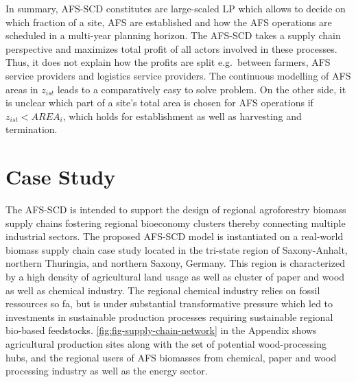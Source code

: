 \documentclass[APA,TimesLARGE]{WileyNJDv5} %
\newcommand{\problemm}{AFS-SCD }
\begin{document}
In summary, \problemm constitutes are large-scaled LP which allows to decide on which fraction of a site, AFS are established and how the AFS operations are scheduled in a multi-year planning horizon. The \problemm takes a supply chain perspective and maximizes total profit of all actors involved in these processes. Thus, it does not explain how the profits are split e.g.~between farmers, AFS service providers and logistics service providers. The continuous modelling of AFS areas in \(z_{ist}\) leads to a comparatively easy to solve problem. On the other side, it is unclear which part of a site's total area is chosen for AFS operations if \(z_{ist} < AREA_i\), which holds for establishment as well as harvesting and termination.

\section{Case Study}\label{sec-casestudy}

The \problemm is intended to support the design of regional agroforestry biomass supply chains fostering regional bioeconomy clusters thereby connecting multiple industrial sectors. The proposed \problemm model is instantiated on a real-world biomass supply chain case study located in the tri-state region of Saxony-Anhalt, northern Thuringia, and northern Saxony, Germany. This region is characterized by a high density of agricultural land usage as well as cluster of paper and wood as well as chemical industry. The regional chemical industry relies on fossil ressources so fa, but is under substantial transformative pressure which led to investments in sustainable production processes requiring sustainable regional bio-based feedstocks. \autoref{fig:fig-supply-chain-network} in the Appendix shows agricultural production sites along with the set of potential wood-processing hubs, and the regional users of AFS biomasses from chemical, paper and wood processing industry as well as the energy sector.
\end{document}
